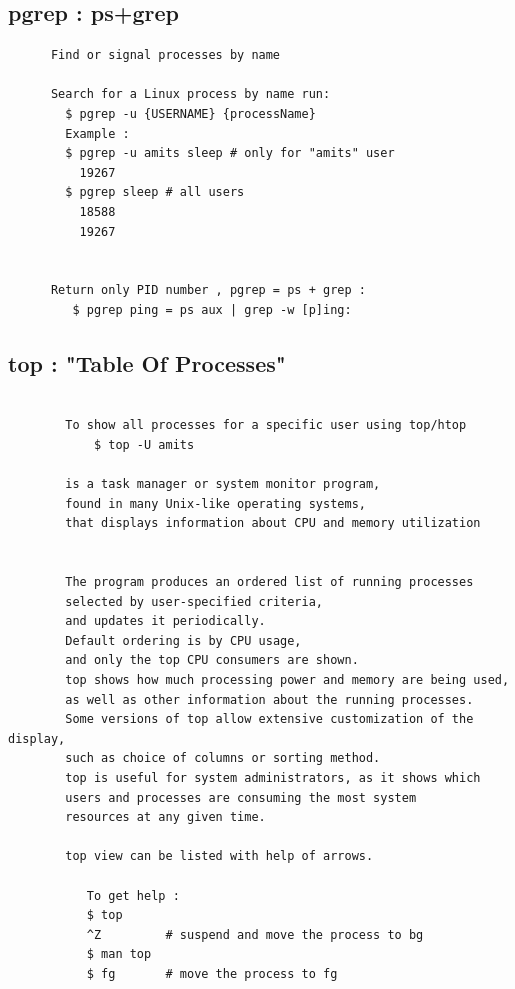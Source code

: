 \documentclass[a4paper,12pt]{article}
\begin{document}
\subsection{pgrep     : ps+grep }
\begin{verbatim}
      Find or signal processes by name

      Search for a Linux process by name run: 
        $ pgrep -u {USERNAME} {processName}
        Example :
        $ pgrep -u amits sleep # only for "amits" user
          19267
        $ pgrep sleep # all users
          18588
          19267


      Return only PID number , pgrep = ps + grep : 
         $ pgrep ping = ps aux | grep -w [p]ing:

\end{verbatim}


\subsection{top     : "Table Of Processes" }
\begin{verbatim}
        
        To show all processes for a specific user using top/htop
            $ top -U amits
                         
        is a task manager or system monitor program,
        found in many Unix-like operating systems, 
        that displays information about CPU and memory utilization
        
        
        The program produces an ordered list of running processes 
        selected by user-specified criteria, 
        and updates it periodically. 
        Default ordering is by CPU usage, 
        and only the top CPU consumers are shown. 
        top shows how much processing power and memory are being used,
        as well as other information about the running processes.
        Some versions of top allow extensive customization of the display,
        such as choice of columns or sorting method.
        top is useful for system administrators, as it shows which
        users and processes are consuming the most system
        resources at any given time.
        
        top view can be listed with help of arrows.
        
           To get help : 
           $ top
           ^Z         # suspend and move the process to bg
           $ man top
           $ fg       # move the process to fg

\end{verbatim}
\end{document}
